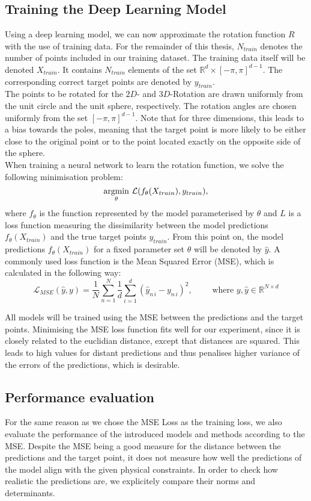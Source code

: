 \subsection{Training the Deep Learning Model}
\indent Using a deep learning model, we can now approximate the rotation function $R$ with the use of training data. For the remainder of this thesis, $N_{train}$ denotes the number of points included in our training dataset. The training data itself will be denoted $X_{train}$. It contains $N_{train}$ elements of the set $\mathbb{R}^{d} \times [- \pi, \pi] ^{d-1}$. The corresponding correct target points are denoted by $y_{train}$.\\
\indent The points to be rotated for the $2D$- and $3D$-Rotation are drawn uniformly from the unit circle and the unit sphere, respectively. The rotation angles are chosen uniformly from the set $[-\pi, \pi]^{d-1}$. Note that for three dimensions, this leads to a bias towards the poles, meaning that the target point is more likely to be either close to the original point or to the point located exactly on the opposite side of the sphere.\\
\indent When training a neural network to learn the rotation function, we solve the following minimisation problem:
\[\underset{\theta}{\operatorname*{argmin}} \,\, \mathcal{L}(f_{\theta} (X_{train}), y_{train}), \]
where $f_\theta$ is the function represented by the model parameterised by $\theta$ and $L$ is a loss function measuring the dissimilarity between the model predictions $f_{\theta} (X_{train})$ and the true target points $y_{train}$. From this point on, the model predictions $f_{\theta} (X_{train})$ for a fixed parameter set $\theta$ will be denoted by $\hat{y}$.
A commonly used loss function is the Mean Squared Error (MSE), which is calculated in the following way:
\[\mathcal{L}_{MSE}(\hat{y}, y) = \frac{1}{N}\sum_{n = 1}^{N} \frac{1}{d} \sum_{i = 1}^{d} (\hat{y}_{n\,i} - y_{n\,i})^2, \qquad \text{ where } y, \hat{y} \in \mathbb{R}^{N \times d}\]

\indent All models will be trained using the MSE between the predictions and the target points. Minimising the MSE loss function fits well for our experiment, since it is closely related to the euclidian distance, except that distances are squared. This leads to high values for distant predictions and thus penalises higher variance of the errors of the predictions, which is desirable.\\ 

\subsection{Performance evaluation}
For the same reason as we chose the MSE Loss as the training loss, we also evaluate the performance of the introduced models and methods according to the MSE. Despite the MSE being a good measure for the distance between the predictions and the target point, it does not measure how well the predictions of the model align with the given physical constraints. In order to check how realistic the predictions are, we explicitely compare their norms and determinants.\\

